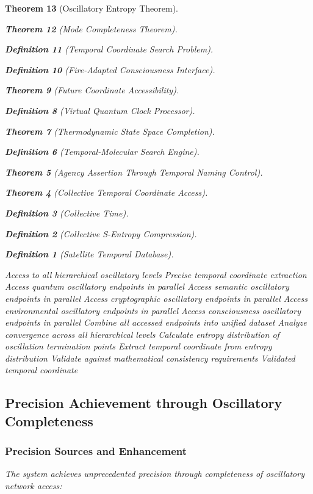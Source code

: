 \documentclass[12pt,a4paper]{article}
\newtheorem{theorem}{Theorem}[section]
\newtheorem{definition}[theorem]{Definition}
\begin{document}
\begin{theorem}[Oscillatory Entropy Theorem]
\begin{theorem}[Mode Completeness Theorem]
\begin{enumerate}
\begin{definition}[Temporal Coordinate Search Problem]
\begin{algorithm}
\begin{definition}[Fire-Adapted Consciousness Interface]
\begin{theorem}[Future Coordinate Accessibility]
\begin{definition}[Virtual Quantum Clock Processor]
\begin{itemize}
\begin{itemize}
\begin{theorem}[Thermodynamic State Space Completion]
\begin{definition}[Temporal-Molecular Search Engine]
\begin{theorem}[Agency Assertion Through Temporal Naming Control]
\begin{remark}
\begin{theorem}[Collective Temporal Coordinate Access]
\begin{definition}[Collective Time]
\begin{definition}[Collective S-Entropy Compression]
\begin{definition}[Satellite Temporal Database]
\begin{algorithm}
\begin{table}[h]
{{\begin{algorithm}[H]
\caption{Complete Oscillatory Access for Temporal Coordinates}
\begin{algorithmic}[1]
\REQUIRE Access to all hierarchical oscillatory levels
\ENSURE Precise temporal coordinate extraction
\STATE Access quantum oscillatory endpoints in parallel
\STATE Access semantic oscillatory endpoints in parallel
\STATE Access cryptographic oscillatory endpoints in parallel
\STATE Access environmental oscillatory endpoints in parallel
\STATE Access consciousness oscillatory endpoints in parallel
\STATE Combine all accessed endpoints into unified dataset
\STATE Analyze convergence across all hierarchical levels
\STATE Calculate entropy distribution of oscillation termination points
\STATE Extract temporal coordinate from entropy distribution
\STATE Validate against mathematical consistency requirements
\RETURN Validated temporal coordinate
\end{algorithmic}
\end{algorithm}

\subsection{Precision Achievement through Oscillatory Completeness}

\subsubsection{Precision Sources and Enhancement}

The system achieves unprecedented precision through completeness of oscillatory network access:

}}
\end{table}
\end{algorithm}
\end{definition}
\end{definition}
\end{definition}
\end{theorem}
\end{remark}
\end{theorem}
\end{definition}
\end{theorem}
\end{itemize}
\end{itemize}
\end{definition}
\end{theorem}
\end{definition}
\end{algorithm}
\end{definition}
\end{enumerate}
\end{theorem}
\end{theorem}
\end{document}
